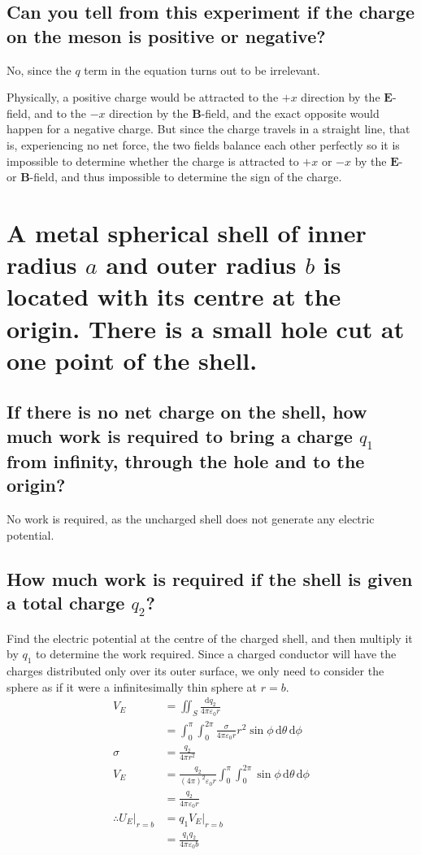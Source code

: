 \documentclass[a4paper]{scrartcl}
\begin{document}
\subsection{Can you tell from this experiment if the charge on the meson is positive or negative?}
No, since the \(q\) term in the equation turns out to be irrelevant.

Physically, a positive charge would be attracted to the \(+x\) direction by the \(\mathbf{E}\)-field, and to the \(-x\) direction by the \(\mathbf{B}\)-field, and the exact opposite would happen for a negative charge. But since the charge travels in a straight line, that is, experiencing no net force, the two fields balance each other perfectly so it is impossible to determine whether the charge is attracted to \(+x\) or \(-x\) by the \(\mathbf{E}\)- or \(\mathbf{B}\)-field, and thus impossible to determine the sign of the charge.

\section{A metal spherical shell of inner radius \(a\) and outer radius \(b\) is located with its centre at the origin. There is a small hole cut at one point of the shell.}
\subsection{If there is no net charge on the shell, how much work is required to bring a charge \(q_1\) from infinity, through the hole and to the origin?}
No work is required, as the uncharged shell does not generate any electric potential.

\subsection{How much work is required if the shell is given a total charge \(q_2\)?}
Find the electric potential at the centre of the charged shell, and then multiply it by \(q_1\) to determine the work required. Since a charged conductor will have the charges distributed only over its outer surface, we only need to consider the sphere as if it were a infinitesimally thin sphere at \(r = b\).
\begin{align*}
    V_E &= \iint_S \frac{\mathrm{d}q_2}{4 \pi \varepsilon_0 r} \\
    &= \int_0^\pi \int_0^{2 \pi} \frac{\sigma}{4 \pi \varepsilon_0 r} r^2 \sin \phi \,\mathrm{d}\theta \,\mathrm{d}\phi \\
    \sigma &= \frac{q_2}{4 \pi r^2} \\
    V_E &= \frac{q_2}{(4 \pi)^2 \varepsilon_0 r} \int_0^\pi \int_0^{2 \pi} \sin \phi \,\mathrm{d}\theta \,\mathrm{d}\phi \\
    &= \frac{q_2}{4 \pi \varepsilon_0 r} \\
    \therefore U_E \bigg|_{r = b} &= q_1 V_E \bigg|_{r = b} \\
    &= \frac{q_1 q_2}{4 \pi \varepsilon_0 b}
\end{align*}
\end{document}
